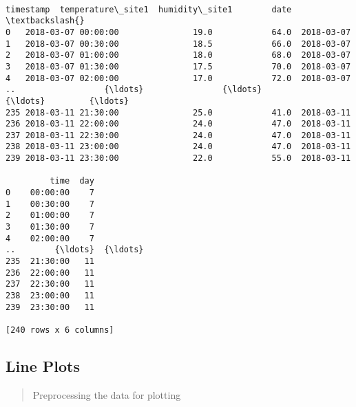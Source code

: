\documentclass[11pt,a3paper]{article}
\begin{document}
    \begin{center}
    \end{center}
    { \hspace*{\fill} \\}
    
    \begin{Verbatim}[commandchars=\\\{\}]
              timestamp  temperature\_site1  humidity\_site1        date  \textbackslash{}
0   2018-03-07 00:00:00               19.0            64.0  2018-03-07
1   2018-03-07 00:30:00               18.5            66.0  2018-03-07
2   2018-03-07 01:00:00               18.0            68.0  2018-03-07
3   2018-03-07 01:30:00               17.5            70.0  2018-03-07
4   2018-03-07 02:00:00               17.0            72.0  2018-03-07
..                  {\ldots}                {\ldots}             {\ldots}         {\ldots}
235 2018-03-11 21:30:00               25.0            41.0  2018-03-11
236 2018-03-11 22:00:00               24.0            47.0  2018-03-11
237 2018-03-11 22:30:00               24.0            47.0  2018-03-11
238 2018-03-11 23:00:00               24.0            47.0  2018-03-11
239 2018-03-11 23:30:00               22.0            55.0  2018-03-11

         time  day
0    00:00:00    7
1    00:30:00    7
2    01:00:00    7
3    01:30:00    7
4    02:00:00    7
..        {\ldots}  {\ldots}
235  21:30:00   11
236  22:00:00   11
237  22:30:00   11
238  23:00:00   11
239  23:30:00   11

[240 rows x 6 columns]
    \end{Verbatim}

    \hypertarget{line-plots}{%
\subsection{Line Plots}\label{line-plots}}

\begin{quote}
Preprocessing the data for plotting
\end{quote}
\end{document}
